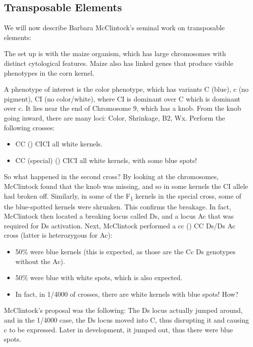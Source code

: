 \subsection{Transposable Elements}

We will now describe Barbara McClintock's seminal work on transposable elements: 


\begin{exper}
	The set up is with the maize organism, which has large chromosomes with distinct cytological features. Maize also has linked genes that produce visible phenotypes in the corn kernel.

	A phenotype of interest is the color phenotype, which has variants C (blue), c (no pigment), C\tss I (no color/white), where C\tss I is dominant over C which is dominant over c.
	It lies near the end of Chromosome 9, which has a knob. From the knob going inward, there are many loci: Color, Shrinkage, B2, Wx.
	Perform the following crosses:
	\begin{itemize}
		\item CC (\x) C\tss IC\tss I \to all white kernels.
		\item CC (special) (\x) C\tss IC\tss I \to all white kernels, with some blue spots!  
	\end{itemize}
	So what happened in the second cross? By looking at the chromosomes, McClintock found that the knob was missing, and so in some kernels the C\tss I allele had broken off.
	Similarly, in some of the F\textsubscript1 kernels in the special cross, some of the blue-spotted kernels were shrunken. This confirms the breakage.
	In fact, McClintock then located a breaking locus called Ds, and a locus Ac that was required for Ds activation.
	Next, McClintock performed a cc (\x) CC Ds/Ds Ac cross (latter is heterozygous for Ac):
	\begin{itemize}
		\item 50\% were blue kernels (this is expected, as those are the Cc Ds genotypes without the Ac).
		\item 50\% were blue with white spots, which is also expected.
		\item In fact, in 1/4000 of crosses, there are white kernels with blue spots! How?
	\end{itemize}
	McClintock's proposal was the following: The Ds locus actually jumped around, and in the 1/4000 case, the Ds locus moved into C, thus disrupting it and causing c to be expressed. Later in development, it jumped out, thus there were blue spots.
\end{exper}

